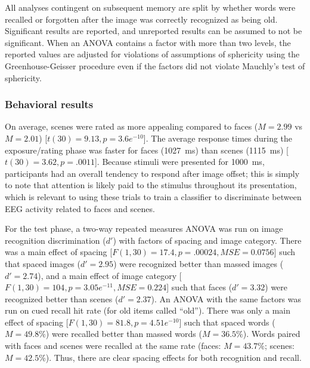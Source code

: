 All analyses contingent on subsequent memory are split by whether words were recalled or forgotten after the image was correctly recognized as being old.
Significant results are reported, and unreported results can be assumed to not be significant.
When an ANOVA contains a factor with more than two levels, the reported values are adjusted for violations of assumptions of sphericity using the Greenhouse-Geisser procedure \cite{GreeGeis1959} even if the factors did not violate Mauchly's test of sphericity.

\subsubsection{Behavioral results}

On average, scenes were rated as more appealing compared to faces ($M=2.99$ vs $M=2.01$) [$t(30)=9.13, p=3.6e^{-10}$].  The average response times during the exposure/rating phase was faster for faces (1027~ms) than scenes (1115~ms) [$t(30)=3.62, p=.0011$].  Because stimuli were presented for 1000~ms, participants had an overall tendency to respond after image offset; this is simply to note that attention is likely paid to the stimulus throughout its presentation, which is relevant to using these trials to train a classifier to discriminate between EEG activity related to faces and scenes.


For the test phase, a two-way repeated measures ANOVA was run on image recognition discrimination ($d'$) with factors of spacing and image category.  There was a main effect of spacing [$F(1,30)=17.4, p=.00024, MSE=0.0756$] such that spaced images ($d'=2.95$) were recognized better than massed images ($d'=2.74$), and a main effect of image category [$F(1,30)=104, p=3.05e^{-11}, MSE=0.224$] such that faces ($d'=3.32$) were recognized better than scenes ($d'=2.37$).  An ANOVA with the same factors was run on cued recall hit rate (for old items called ``old'').  There was only a main effect of spacing [$F(1,30)=81.8, p=4.51e^{-10}$] such that spaced words ($M=49.8\%$) were recalled better than massed words ($M=36.5\%$).  Words paired with faces and scenes were recalled at the same rate (faces: $M=43.7\%$; scenes: $M=42.5\%$).  Thus, there are clear spacing effects for both recognition and recall.

